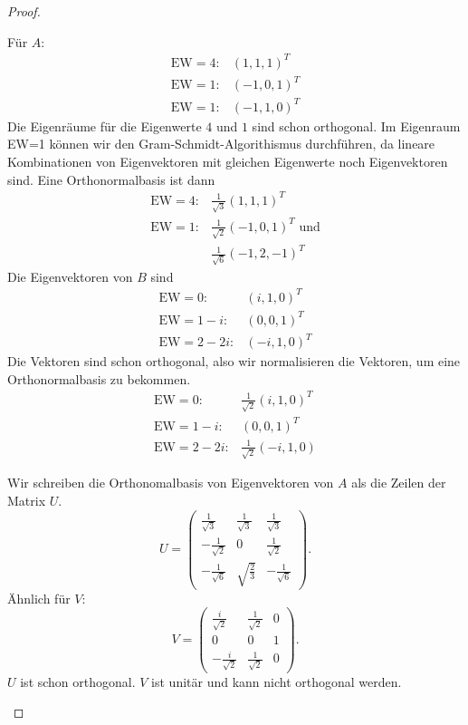 \begin{proof}
\begin{parts}
	F\"{u}r $A$:
	\begin{align*}
		\text{EW}=4:&(1,1,1)^T\\
		\text{EW}=1:&(-1,0,1)^T\\
		\text{EW}=1:&(-1,1,0)^T
	\end{align*} 
	Die Eigenräume f\"{u}r die Eigenwerte $4$ und $1$ sind schon orthogonal. Im Eigenraum EW=1 können wir den Gram-Schmidt-Algorithismus durchführen, da lineare Kombinationen von Eigenvektoren mit gleichen Eigenwerte noch Eigenvektoren sind. Eine Orthonormalbasis ist dann
	\begin{align*}
		\text{EW}=4:&\frac{1}{\sqrt{3} }(1,1,1)^T\\
		\text{EW}=1:&\frac{1}{\sqrt{2} }(-1,0,1)^T\text{ und}\\
			    &\frac{1}{\sqrt{6} }(-1,2,-1)^T
	\end{align*}
	Die Eigenvektoren von $B$ sind
	\begin{align*}
		\text{EW}=0:&(i,1,0)^T\\
		\text{EW}=1-i:&(0,0,1)^T\\
		\text{EW}=2-2i:&(-i,1,0)^T
	\end{align*}
	Die Vektoren sind schon orthogonal, also wir normalisieren die Vektoren, um eine Orthonormalbasis zu bekommen.
	\begin{align*}
		\text{EW}=0:&\frac{1}{\sqrt{2} }(i,1,0)^T\\
		\text{EW}=1-i:&(0,0,1)^T\\
		\text{EW}=2-2i:&\frac{1}{\sqrt{2} }(-i,1,0)
	\end{align*}
\item Wir schreiben die Orthonomalbasis von Eigenvektoren von $A$ als die Zeilen der Matrix $U$. 
	\[
		U=\begin{pmatrix} \frac{1}{\sqrt{3} }& \frac{1}{\sqrt{3} } & \frac{1}{\sqrt{3} } \\ -\frac{1}{\sqrt{2} } & 0 & \frac{1}{\sqrt{2} }\\ -\frac{1}{\sqrt{6} } & \sqrt{\frac{2}{3}} & -\frac{1}{\sqrt{6} } \end{pmatrix} 
	.\] 
	Ähnlich f\"{u}r $V$:
	\[
		V=\begin{pmatrix} \frac{i}{\sqrt{2} } & \frac{1}{\sqrt{2} } & 0 \\ 0 & 0 & 1 \\ -\frac{i}{\sqrt{2} } & \frac{1}{\sqrt{2} } & 0 \end{pmatrix} 
	.\] 
	$U$ ist schon orthogonal. $V$ ist unitär und kann nicht orthogonal werden.\qedhere
	\end{parts}
\end{proof}
